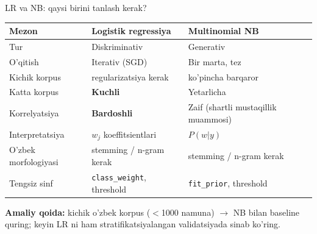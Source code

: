 \documentclass[aspectratio=169,11pt]{beamer}
\begin{document}
\begin{frame}{LR va NB: qaysi birini tanlash kerak?}
  \begin{center}
    \small
    \begin{tabular}{@{}lll@{}}
      \toprule
      Mezon & Logistik regressiya & Multinomial NB \\
      \midrule
      Tur & Diskriminativ & Generativ \\
      O'qitish & Iterativ (SGD) & Bir marta, tez \\
      Kichik korpus & regularizatsiya kerak & ko'pincha barqaror \\
      Katta korpus & \textcolor{deepgreen}{\textbf{Kuchli}} & Yetarlicha \\
      Korrelyatsiya & \textcolor{deepgreen}{\textbf{Bardoshli}} & Zaif (shartli mustaqillik muammosi)\\
      Interpretatsiya & $w_j$ koeffitsientlari & $P(w|y)$ \\
      O'zbek morfologiyasi & stemming / n-gram kerak & stemming / n-gram kerak \\
      Tengsiz sinf & \texttt{class\_weight}, threshold & \texttt{fit\_prior}, threshold \\
      \bottomrule
    \end{tabular}
  \end{center}
  \vspace{4pt}
  \small\textbf{Amaliy qoida:}
  kichik o'zbek korpus ($<$1000 namuna) $\to$ NB bilan baseline quring;
  keyin LR ni ham stratifikatsiyalangan validatsiyada sinab ko'ring.
\end{frame}
\end{document}
